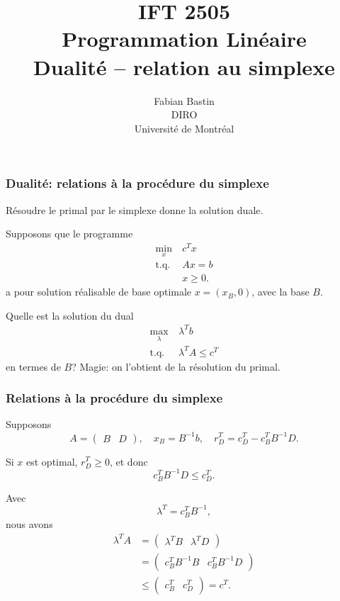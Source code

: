 \documentclass[usepdftitle=false]{beamer}
\title[IFT2505]{IFT 2505\\Programmation Linéaire\\Dualité -- relation au simplexe}
\author[Fabian Bastin]{Fabian Bastin\\DIRO\\Université de Montréal}
\date{}
\begin{document}
\frame{\titlepage}


\begin{frame}
\frametitle{Dualité: relations à la procédure du simplexe}

Résoudre le primal par le simplexe donne la solution duale.

\mbox{}

Supposons que le programme
\begin{align*}
\min_x \ & c^Tx \\
\mbox{t.q. } & Ax = b\\
& x \geq 0.
\end{align*}
a pour solution réalisable de base optimale $x = (x_{B},0)$, avec la base $B$.

\mbox{}

Quelle est la solution du dual
\begin{align*}
\max_{\lambda} \ & \lambda^T b \\
\mbox{t.q. } & \lambda^T A \leq c^T
\end{align*}
en termes de $B$? Magie: on l'obtient de la résolution du primal.


\end{frame}

\begin{frame}
\frametitle{Relations à la procédure du simplexe}

Supposons
\[
A = \begin{pmatrix}
B & D
\end{pmatrix},
\quad
x_B = B^{-1}b,
\quad
r_D^T = c_D^T - c_B^T B^{-1} D.
\]

\mbox{}

Si $x$ est optimal, $r_D^T \geq 0$, et donc
\[
c_B^T B^{-1} D \leq c_D^T.
\]

\mbox{}

Avec
\[
\lambda^T = c_B^T B^{-1},
\]
nous avons
\begin{align*}
\lambda^T A &=
\begin{pmatrix}
\lambda^T B & \lambda^T D
\end{pmatrix} \\
&= \begin{pmatrix}
c_B^T B^{-1}B & c_B^T B^{-1} D
\end{pmatrix} \\
&\leq \begin{pmatrix}
c_B^T & c_D^T
\end{pmatrix} = c^T.
\end{align*}

\end{frame}
\end{document}
